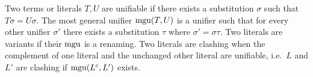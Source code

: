 
\begin{definition}\label{def:unifier}
Two terms or literals $T, U$ are {\myem unifiable} if there exists a substitution $\sigma$ such that $T\sigma=U\sigma$.
The {\myem most general unifier} $\operatorname{mgu}(T,U)$ is a unifier such that
for every other unifier $\sigma'$ there exists a substitution $\tau$ where
$\sigma' = \sigma \tau$. 
Two literals are variants if their $\operatorname{mgu}$ is a renaming.
Two literals are {\myem clashing} when the complement of one literal 
and the unchanged other literal are unifiable, i.e.~$L$ and $L'$ are clashing if $\operatorname{mgu}(L^c, L')$ exists.
\end{definition}